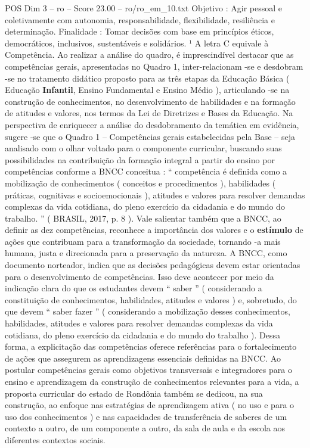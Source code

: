 \begin{textsample}{POS Dim 3 – ro – Score 23.00 – ro/ro\_em\_10.txt}
Objetivo : Agir pessoal e coletivamente com autonomia, responsabilidade, flexibilidade, resiliência e determinação.
Finalidade : Tomar decisões com base em princípios éticos, democráticos, inclusivos, sustentáveis e solidários. ¹ A letra C equivale à Competência.
Ao realizar a análise do quadro, é imprescindível destacar que as competências gerais, apresentadas no Quadro 1, inter-relacionam -se e desdobram -se no tratamento didático proposto para as três etapas da Educação Básica ( Educação \textbf{Infantil}, Ensino Fundamental e Ensino Médio ), articulando -se na construção de conhecimentos, no desenvolvimento de habilidades e na formação de atitudes e valores, nos termos da Lei de Diretrizes e Bases da Educação.
Na perspectiva de enriquecer a análise do desdobramento da temática em evidência, sugere -se que o Quadro 1 – Competências gerais estabelecidas pela Base – seja analisado com o olhar voltado para o componente curricular, buscando suas possibilidades na contribuição da formação integral a partir do ensino por competências conforme a BNCC conceitua : “ competência é definida como a mobilização de conhecimentos ( conceitos e procedimentos ), habilidades ( práticas, cognitivas e socioemocionais ), atitudes e valores para resolver demandas complexas da vida cotidiana, do pleno exercício da cidadania e do mundo do trabalho. ” ( BRASIL, 2017, p. 8 ).
Vale salientar também que a BNCC, ao definir as dez competências, reconhece a importância dos valores e o \textbf{estímulo} de ações que contribuam para a transformação da sociedade, tornando -a mais humana, justa e direcionada para a preservação da natureza.
A BNCC, como documento norteador, indica que as decisões pedagógicas devem estar orientadas para o desenvolvimento de competências.
Isso deve acontecer por meio da indicação clara do que os estudantes devem “ saber ” ( considerando a constituição de conhecimentos, habilidades, atitudes e valores ) e, sobretudo, do que devem “ saber fazer ” ( considerando a mobilização desses conhecimentos, habilidades, atitudes e valores para resolver demandas complexas da vida cotidiana, do pleno exercício da cidadania e do mundo do trabalho ).
Dessa forma, a explicitação das competências oferece referências para o fortalecimento de ações que assegurem as aprendizagens essenciais definidas na BNCC.
Ao postular competências gerais como objetivos transversais e integradores para o ensino e aprendizagem da construção de conhecimentos relevantes para a vida, a proposta curricular do estado de Rondônia também se dedicou, na sua construção, ao enfoque nas estratégias de aprendizagem ativa ( no uso e para o uso dos conhecimentos ) e nas capacidades de transferência de saberes de um contexto a outro, de um componente a outro, da sala de aula e da escola aos diferentes contextos sociais.

\end{textsample}
